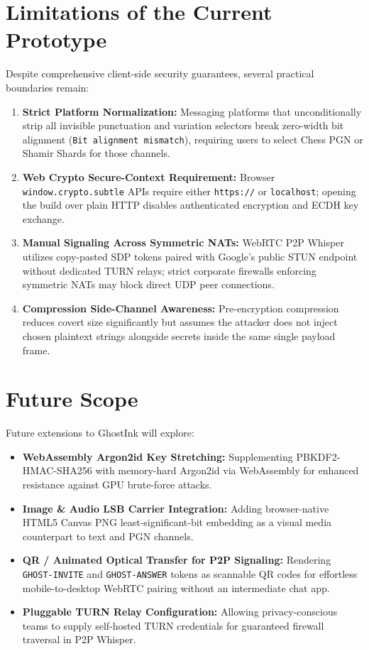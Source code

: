 \documentclass[12pt,a4paper,oneside,openany]{report}
\begin{document}
\section{Limitations of the Current Prototype}
Despite comprehensive client-side security guarantees, several practical boundaries remain:
\begin{enumerate}
    \item \textbf{Strict Platform Normalization:} Messaging platforms that unconditionally strip all invisible punctuation and variation selectors break zero-width bit alignment (\texttt{Bit alignment mismatch}), requiring users to select Chess PGN or Shamir Shards for those channels.
    \item \textbf{Web Crypto Secure-Context Requirement:} Browser \texttt{window.crypto.subtle} APIs require either \texttt{https://} or \texttt{localhost}; opening the build over plain HTTP disables authenticated encryption and ECDH key exchange.
    \item \textbf{Manual Signaling Across Symmetric NATs:} WebRTC P2P Whisper utilizes copy-pasted SDP tokens paired with Google's public STUN endpoint without dedicated TURN relays; strict corporate firewalls enforcing symmetric NATs may block direct UDP peer connections.
    \item \textbf{Compression Side-Channel Awareness:} Pre-encryption compression reduces covert size significantly but assumes the attacker does not inject chosen plaintext strings alongside secrets inside the same single payload frame.
\end{enumerate}

\section{Future Scope}
Future extensions to GhostInk will explore:
\begin{itemize}
    \item \textbf{WebAssembly Argon2id Key Stretching:} Supplementing PBKDF2-HMAC-SHA256 with memory-hard Argon2id via WebAssembly for enhanced resistance against GPU brute-force attacks.
    \item \textbf{Image \& Audio LSB Carrier Integration:} Adding browser-native HTML5 Canvas PNG least-significant-bit embedding as a visual media counterpart to text and PGN channels.
    \item \textbf{QR / Animated Optical Transfer for P2P Signaling:} Rendering \texttt{GHOST-INVITE} and \texttt{GHOST-ANSWER} tokens as scannable QR codes for effortless mobile-to-desktop WebRTC pairing without an intermediate chat app.
    \item \textbf{Pluggable TURN Relay Configuration:} Allowing privacy-conscious teams to supply self-hosted TURN credentials for guaranteed firewall traversal in P2P Whisper.
\end{itemize}
\end{document}
